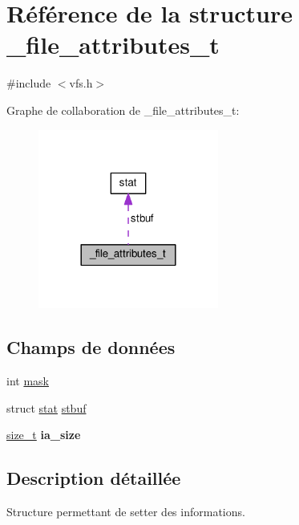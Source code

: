 \hypertarget{struct__file__attributes__t}{\section{Référence de la structure \+\_\+file\+\_\+attributes\+\_\+t}
\label{struct__file__attributes__t}
}


{\ttfamily \#include $<$vfs.\+h$>$}



Graphe de collaboration de \+\_\+file\+\_\+attributes\+\_\+t\+:
\nopagebreak
\begin{figure}[H]
\begin{center}
\leavevmode
\includegraphics[width=168pt]{struct__file__attributes__t__coll__graph}
\end{center}
\end{figure}
\subsection*{Champs de données}
\begin{DoxyCompactItemize}
\item 
int \hyperlink{struct__file__attributes__t_a51072887a2d07ba9e5566cef453c3707}{mask}
\item 
struct \hyperlink{structstat}{stat} \hyperlink{struct__file__attributes__t_aa42b25ef9e64509420c287ab6b60c8a8}{stbuf}
\item 
\hypertarget{struct__file__attributes__t_ae1424de59c1c74710ce2cc66ce03a3af}{\hyperlink{kernel_2include_2types_8h_a29d85914ddff32967d85ada69854206d}{size\+\_\+t} {\bfseries ia\+\_\+size}}\label{struct__file__attributes__t_ae1424de59c1c74710ce2cc66ce03a3af}

\end{DoxyCompactItemize}


\subsection{Description détaillée}
Structure permettant de setter des informations. 

